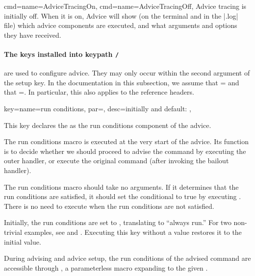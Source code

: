 \documentclass[a4paper,11pt]{article}
\begin{document}
\begin{doc}{
    cmd={name=AdviceTracingOn},
    cmd={name=AdviceTracingOff},
  }
  Advice tracing is initially off. When it is on, Advice will show (on the
  terminal and in the |.log| file) which advice components are executed, and
  what arguments and options they have received.
\end{doc}

\paragraph*{The keys installed into keypath \texttt{/}}
are used to configure advice.  They may only occur within the second
argument of the setup key.  In the documentation in this subsection, we assume
that = and that =.  In particular, this also applies to the reference
headers.

\begingroup
{}

\begin{doc}{%
    key={name=run conditions, par=,
      desc=initially and default: },
  }
  
  This key declares the  as the run conditions component
  of the advice.

  The run conditions macro is executed at the very start of the advice.  Its
  function is to decide whether we should proceed to advise the command by
  executing the outer handler, or execute the original command (after invoking
  the bailout handler).

  The run conditions macro should take no arguments.  If it determines that the
  run conditions are satisfied, it should set the  conditional
   to true by executing .
  There is no need to execute  when the run
  conditions are not satisfied.

  Initially, the run conditions are set to , translating to
  ``always run.''  For two non-trivial examples, see  and .  Executing this
  key without a value restores it to the initial value.

  During advising and advice setup, the run conditions of the advised command
  are accessible through , a parameterless
  macro expanding to the given .
\end{doc}
\end{document}
